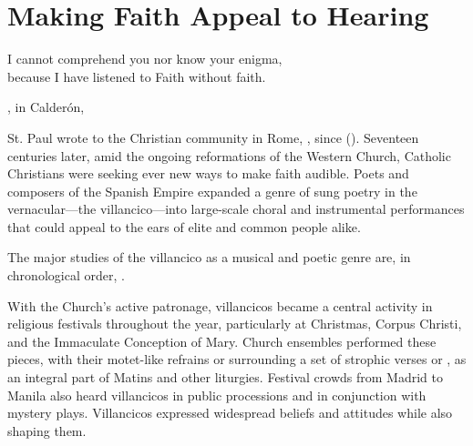 %
%
%

\chapter{Making Faith Appeal to Hearing}

\label{ch:faith-hearing}

\epigraph
{I cannot comprehend you nor know your enigma,\\
because I have listened to Faith without faith.}
{, in Calderón, }

St. Paul wrote to the Christian community in Rome, , since  ().
Seventeen centuries later, amid the ongoing reformations of the Western Church, Catholic Christians were seeking ever new ways to make faith audible.
Poets and composers of the Spanish Empire expanded a genre of sung poetry in the vernacular---the villancico---into large-scale choral and instrumental performances that could appeal to the ears of elite and common people alike.%
\begin{Footnote}
    The major studies of the villancico as a musical and poetic genre are, in chronological order, 
    \autocites{Rubio:Forma}{Laird:VC}{Torrente:PhD}{Tenorio:SorJuana}
    {CaberoPueyo:PhD}{Illari:Polychoral}{Knighton-Torrente:VCs}
    {Cashner:Cards}{Cashner:PhD}.
\end{Footnote}

With the Church's active patronage, villancicos became a central activity in religious festivals throughout the year, particularly at Christmas, Corpus Christi, and the Immaculate Conception of Mary.
Church ensembles performed these pieces, with their motet-like refrains or  surrounding a set of strophic verses or , as an integral part of Matins and other liturgies.
Festival crowds from Madrid to Manila also heard villancicos in public processions and in conjunction with mystery plays.
Villancicos expressed widespread beliefs and attitudes while also shaping them.

